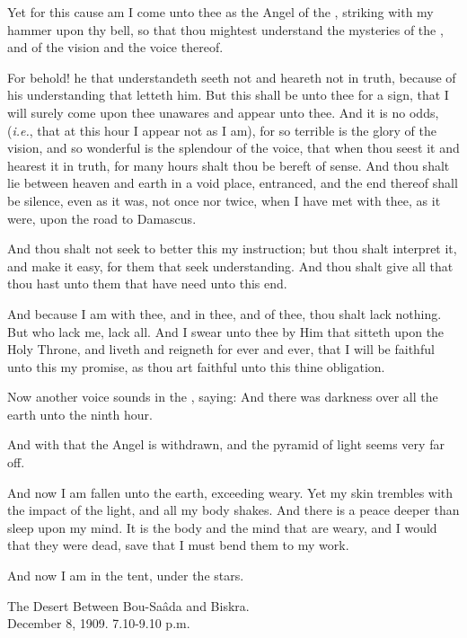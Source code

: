 Yet for this cause am I come unto thee as the Angel of the \AEthyr, striking with my hammer upon thy bell, so that thou mightest understand the mysteries of the \AEthyr, and of the vision and the voice thereof.

For behold! he that understandeth seeth not and heareth not in truth, because of his understanding that letteth him. But this shall be unto thee for a sign, that I will surely come upon thee unawares and appear unto thee. And it is no odds, (\textit{i.e.}, that at this hour I appear not as I am), for so terrible is the glory of the vision, and so wonderful is the splendour of the voice, that when thou seest it and hearest it in truth, for many hours shalt thou be bereft of sense. And thou shalt lie between heaven and earth in a void place, entranced, and the end thereof shall be silence, even as it was, not once nor twice, when I have met with thee, as it were, upon the road to Damascus.

And thou shalt not seek to better this my instruction; but thou shalt interpret it, and make it easy, for them that seek understanding. And thou shalt give all that thou hast unto them that have need unto this end.

And because I am with thee, and in thee, and of thee, thou shalt lack nothing. But who lack me, lack all. And I swear unto thee by Him that sitteth upon the Holy Throne, and liveth and reigneth for ever and ever, that I will be faithful unto this my promise, as thou art faithful unto this thine obligation.

Now another voice sounds in the \AEthyr, saying: And there was darkness over all the earth unto the ninth hour.

And with that the Angel is withdrawn, and the pyramid of light seems very far off.

And now I am fallen unto the earth, exceeding weary. Yet my skin trembles with the impact of the light, and all my body shakes. And there is a peace deeper than sleep upon my mind. It is the body and the mind that are weary, and I would that they were dead, save that I must bend them to my work.

And now I am in the tent, under the stars.


\begin{quoting}
\centering
The Desert Between Bou-Sa\^{a}da and Biskra. \\
December 8, 1909. 7.10-9.10 p.m.
\end{quoting}
